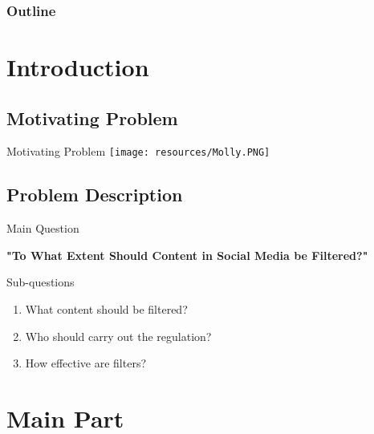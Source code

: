 
    \begin{frame}%
      \frametitle{Outline}%
      \tableofcontents%
    \end{frame}%
    
    \section{Introduction}
    \subsection{Motivating Problem}
    \begin{frame}{Motivating Problem}
      \texttt{[image: resources/Molly.PNG]}
    \end{frame}
    \subsection{Problem Description}
    \begin{frame}{Main Question}
    \begin{center}
        \textbf{"To What Extent Should Content in Social Media be Filtered?"}
    \end{center}
    \begin{block}{Sub-questions}
        \begin{enumerate}
       \item What content should be filtered?
       \item Who should carry out the regulation?
       \item How effective are filters?
       \end{enumerate}
       \end{block}
    \end{frame}
    
    \section{Main Part} %
